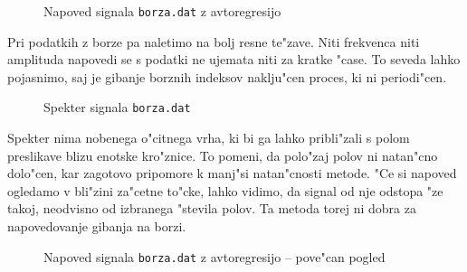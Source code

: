 \documentclass[a4paper,10pt]{article}
\begin{document}
\begin{figure}[H]
 \centering
 \caption{Napoved signala \texttt{borza.dat} z avtoregresijo}
 \label{fig:napoved-borza}
\end{figure}

Pri podatkih z borze pa naletimo na bolj resne te"zave. Niti frekvenca niti amplituda napovedi se s podatki ne ujemata niti za kratke "case. To seveda lahko pojasnimo, saj je gibanje borznih indeksov naklju"cen proces, ki ni periodi"cen.

\begin{figure}[H]
 \centering
 \caption{Spekter signala \texttt{borza.dat}}
 \label{fig:psd-borza}
\end{figure}

Spekter nima nobenega o"citnega vrha, ki bi ga lahko pribli"zali s polom preslikave blizu enotske kro"znice. To pomeni, da polo"zaj polov ni natan"cno dolo"cen, kar zagotovo pripomore k manj"si natan"cnosti metode. "Ce si napoved ogledamo v bli"zini za"cetne to"cke, lahko vidimo, da signal od nje odstopa "ze takoj, neodvisno od izbranega "stevila polov. Ta metoda torej ni dobra za napovedovanje gibanja na borzi. 

\begin{figure}[H]
 \centering
 \caption{Napoved signala \texttt{borza.dat} z avtoregresijo -- pove"can pogled}
 \label{fig:napoved-borza-zoom}
\end{figure}
 
\end{document}
